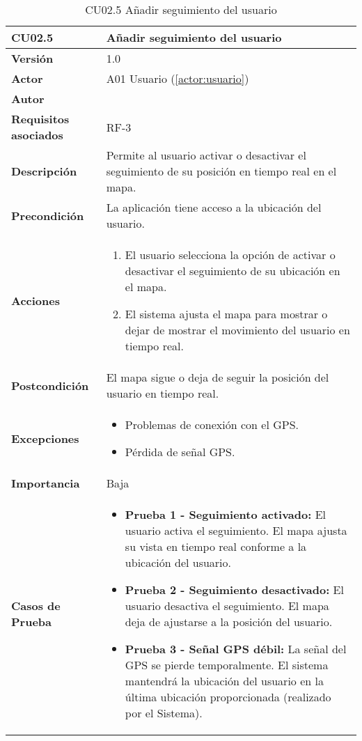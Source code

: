 \begin{table}[H]
	\centering
	\begin{tabularx}{\linewidth}{ p{} p{} }
		\toprule
		\textbf{CU02.5}    & \textbf{Añadir seguimiento del usuario} \\
		\toprule
		\textbf{Versión}              & 1.0    \\
		\textbf{Actor}                & A01 Usuario (\ref{actor:usuario}) \\
		\textbf{Autor}                & \autor \\
		\textbf{Requisitos asociados} & RF-3 \\
		\textbf{Descripción}          & Permite al usuario activar o desactivar el seguimiento de su posición en tiempo real en el mapa. \\
		\textbf{Precondición}         & La aplicación tiene acceso a la ubicación del usuario. \\
		\textbf{Acciones}             &
		\begin{enumerate}
			\def\labelenumi{\arabic{enumi}.}
			\tightlist
			\item El usuario selecciona la opción de activar o desactivar el seguimiento de su ubicación en el mapa.
			\item El sistema ajusta el mapa para mostrar o dejar de mostrar el movimiento del usuario en tiempo real.
		\end{enumerate}\\
		\textbf{Postcondición}        & El mapa sigue o deja de seguir la posición del usuario en tiempo real. \\
		\textbf{Excepciones}          & 
		\begin{itemize}
			\tightlist
			\item Problemas de conexión con el GPS.
			\item Pérdida de señal GPS.
		\end{itemize}\\
		\textbf{Importancia}          & Baja \\
		\textbf{Casos de Prueba}      &
		\begin{itemize}
			\item \textbf{Prueba 1 - Seguimiento activado:} El usuario activa el seguimiento. El mapa ajusta su vista en tiempo real conforme a la ubicación del usuario.
			\vspace{2pt}
			\item \textbf{Prueba 2 - Seguimiento desactivado:} El usuario desactiva el seguimiento. El mapa deja de ajustarse a la posición del usuario.
			\vspace{2pt}
			\item \textbf{Prueba 3 - Señal GPS débil:} La señal del GPS se pierde temporalmente. El sistema mantendrá la ubicación del usuario en la última ubicación proporcionada (realizado por el Sistema).
		\end{itemize} \\
		\bottomrule
	\end{tabularx}
	\caption{CU02.5 Añadir seguimiento del usuario}
	\label{cu:añadir-seguimiento}
\end{table}



